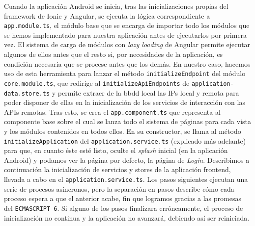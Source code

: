 Cuando la aplicación Android se inicia, tras las inicializaciones propias del framework de Ionic y Angular, se ejecuta la lógica correspondiente a \verb|app.module.ts|, el módulo base que se encarga de importar todo los módulos que se hemos implementado para nuestra aplicación antes de ejecutarlos por primera vez. El sistema de carga de módulos con \textit{lazy loading} de Angular permite ejecutar algunos de ellos antes que el resto si, por necesidades de la aplicación, es condición necesaria que se procese antes que los demás. En nuestro caso, hacemos uso de esta herramienta para lanzar el método \verb|initializeEndpoint| del módulo \verb|core.module.ts|, que redirige al \verb|initializeApiEndpoints| de \verb|application-data.store.ts| y permite extraer de la \gls{bbdd} local las IPs local y remota para poder disponer de ellas en la inicialización de los servicios de interacción con las APIs remotas.
\vspace{0.5cm}
Tras esto, se crea el \verb|app.component.ts| que representa al componente base sobre el cual se lanza todo el sistema de páginas para cada vista y los módulos contenidos en todos ellos. En su constructor, se llama al método \verb|initializeApplication| del \verb|application.service.ts| (explicado más adelante) para que, en cuanto éste esté listo, oculte el \textit{splash} inicial (en la aplicación Android) y podamos ver la página por defecto, la página de \textit{Login}.
\vspace{0.5cm}
Describimos a continuación la inicialización de servicios y stores de la aplicación frontend, llevada a cabo en el \verb|application.service.ts|. Los pasos siguientes ejecutan una serie de procesos asíncronos, pero la separación en pasos describe cómo cada proceso espera a que el anterior acabe, fin que logramos gracias a las promesas del \verb|ECMASCRIPT 6|. Si alguno de los pasos finalizara erróneamente, el proceso de inicialización no continua y la aplicación no avanzará, debiendo así ser reiniciada.
